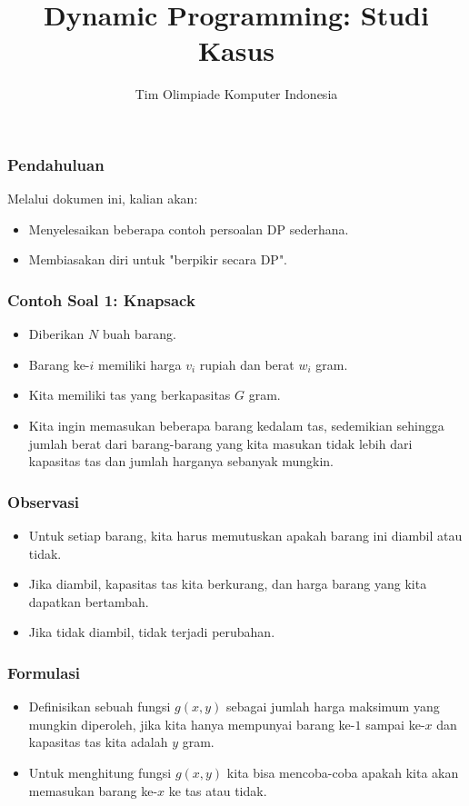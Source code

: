 

\title{Dynamic Programming: \newline Studi Kasus}
\author{Tim Olimpiade Komputer Indonesia}
\date{}

\usepackage{qtree}


\begin{frame}
\titlepage
\end{frame}

\begin{frame}
\frametitle{Pendahuluan}
Melalui dokumen ini, kalian akan:
\begin{itemize}
  \item Menyelesaikan beberapa contoh persoalan DP sederhana.
  \item Membiasakan diri untuk "berpikir secara DP".
\end{itemize}
\end{frame}

\begin{frame} 
\frametitle{Contoh Soal 1: Knapsack}
\begin{itemize}
  \item Diberikan $N$ buah barang. 
  \item Barang ke-$i$ memiliki harga $v_i$ rupiah dan berat $w_i$ gram. 
  \item Kita memiliki tas yang berkapasitas $G$ gram. 
  \item Kita ingin memasukan beberapa barang kedalam tas, sedemikian sehingga jumlah berat dari barang-barang yang kita masukan tidak lebih dari kapasitas tas dan jumlah harganya sebanyak mungkin.
\end{itemize}
\end{frame}

\begin{frame} 
\frametitle{Observasi}
\begin{itemize}
  \item Untuk setiap barang, kita harus memutuskan apakah barang ini diambil atau tidak.
  \item Jika diambil, kapasitas tas kita berkurang, dan harga barang yang kita dapatkan bertambah.
  \item Jika tidak diambil, tidak terjadi perubahan.
\end{itemize}
\end{frame}

\begin{frame} 
\frametitle{Formulasi}
\begin{itemize}
  \item Definisikan sebuah fungsi $g(x,y)$ sebagai jumlah harga maksimum yang mungkin diperoleh, jika kita hanya mempunyai barang ke-$1$ sampai ke-$x$ dan kapasitas tas kita adalah $y$ gram.
  \item Untuk menghitung fungsi $g(x,y)$ kita bisa mencoba-coba apakah kita akan memasukan barang ke-$x$ ke tas atau tidak.
\end{itemize}
\end{frame}

